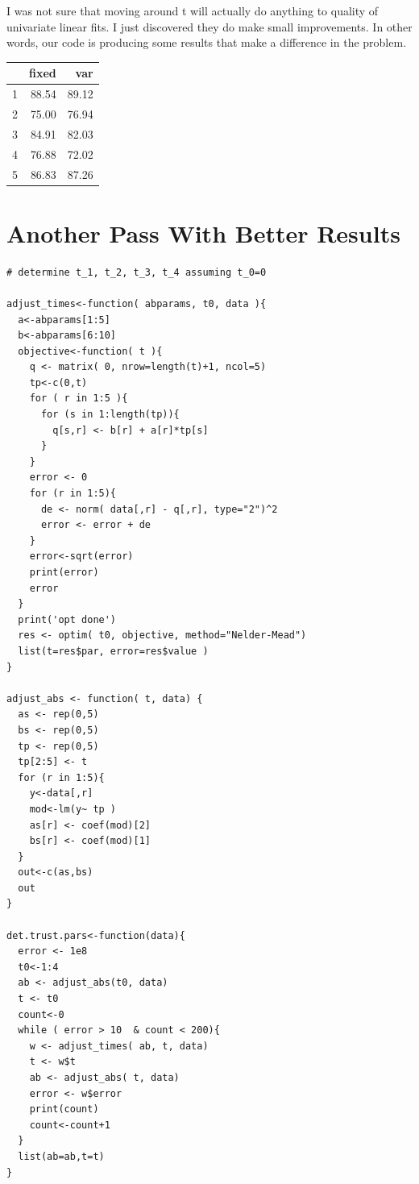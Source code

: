 \documentclass{amsart}
\begin{document}
I was not sure that moving around t will actually do anything to quality of univariate linear fits.  I just discovered they do make small improvements.  In other words, our code is producing some results that make a difference in the problem.

\begin{table}[ht]
\centering
\begin{tabular}{rrr}
  \hline
 & fixed & var \\ 
  \hline
1 & 88.54 & 89.12 \\ 
  2 & 75.00 & 76.94 \\ 
  3 & 84.91 & 82.03 \\ 
  4 & 76.88 & 72.02 \\ 
  5 & 86.83 & 87.26 \\ 
   \hline
\end{tabular}
\end{table}

\section{Another Pass With Better Results}

\begin{verbatim}
# determine t_1, t_2, t_3, t_4 assuming t_0=0

adjust_times<-function( abparams, t0, data ){
  a<-abparams[1:5]
  b<-abparams[6:10]
  objective<-function( t ){
    q <- matrix( 0, nrow=length(t)+1, ncol=5)
    tp<-c(0,t)
    for ( r in 1:5 ){
      for (s in 1:length(tp)){
        q[s,r] <- b[r] + a[r]*tp[s]
      }
    }
    error <- 0
    for (r in 1:5){
      de <- norm( data[,r] - q[,r], type="2")^2
      error <- error + de
    }
    error<-sqrt(error)
    print(error)
    error
  }
  print('opt done')
  res <- optim( t0, objective, method="Nelder-Mead")
  list(t=res$par, error=res$value )
}

adjust_abs <- function( t, data) {
  as <- rep(0,5)
  bs <- rep(0,5)
  tp <- rep(0,5)
  tp[2:5] <- t 
  for (r in 1:5){
    y<-data[,r]
    mod<-lm(y~ tp )
    as[r] <- coef(mod)[2]
    bs[r] <- coef(mod)[1]
  }
  out<-c(as,bs)
  out
}

det.trust.pars<-function(data){
  error <- 1e8
  t0<-1:4
  ab <- adjust_abs(t0, data)
  t <- t0
  count<-0
  while ( error > 10  & count < 200){
    w <- adjust_times( ab, t, data)
    t <- w$t
    ab <- adjust_abs( t, data)
    error <- w$error
    print(count)
    count<-count+1
  }
  list(ab=ab,t=t)
}
\end{verbatim}
\end{document}
